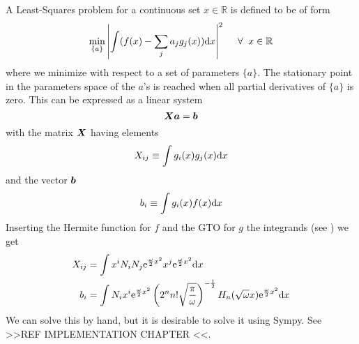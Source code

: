     A Least-Squares problem for a continuous set $x\in\mathbb{R}$ is defined to
    be of form
        \begin{equation}
            \min_{\{a\}} \abs{\int (f(x) - \sum_ja_jg_j(x)) \md x}^2 \indent
            \forall \;\;x\in\mathbb{R}
        \end{equation}
    where we minimize with respect to a set of parameters $\{a\}$. The
    stationary point in the parameters space of the $a$'s is reached when all
    partial derivatives of $\{a\}$ is zero. This can be expressed as a linear system
        \begin{equation}
            \boldsymbol{{X}} \boldsymbol{{a}} = \boldsymbol{{b}}
        \end{equation}
    with the matrix $\boldsymbol{{X}}$ having elements
        \begin{equation}
            X_{ij} \equiv \int g_i(x)g_j(x) \mathrm{d} x
        \end{equation}
    and the vector $\boldsymbol{{b}}$
        \begin{equation}
            b_i \equiv \int g_i(x)f(x) \mathrm{d} x
        \end{equation}
    Inserting the Hermite function for $f$ and the GTO for $g$ the integrands
    (see ) we get
        \begin{equation}
            \begin{aligned}
                X_{ij} &= \int x^i N_i N_j \mathrm{e}^{\frac{\omega}{2} x^2} x^j
                \mathrm{e}^{\frac{\omega}{2} x^2} \mathrm{d} x \\
                b_i &= \int N_i x^i \mathrm{e}^{\frac{\omega}{2} x^2}
                \left(2^nn!\sqrt{\frac{\pi}{\omega}}\right)^{-\frac{1}{2}}
                H_n(\sqrt{\omega}x) \mathrm{e}^{\frac{\omega}{2} x^2} \mathrm{d} x
            \end{aligned}
        \end{equation}
    We can solve this by hand, but it is desirable to solve it using Sympy. See
    >>REF IMPLEMENTATION CHAPTER <<.
